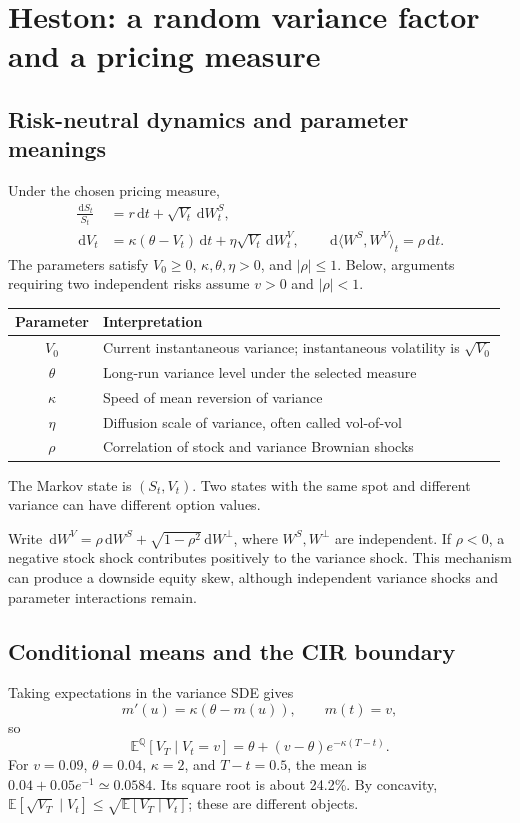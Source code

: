 \documentclass[10pt]{article}
\newcommand{\E}{\mathbb E}\newcommand{\Q}{\mathbb Q}\newcommand{\cF}{\mathcal F}
\newcommand{\dd}{\,\mathrm d}\newcommand{\Pp}{\mathbb P}\newcommand{\Var}{\operatorname{Var}}\newcommand{\Cov}{\operatorname{Cov}}
\theoremstyle{definition}\newtheorem{definition}{Definition}[section]
\begin{document}
\section{Heston: a random variance factor and a pricing measure}
\subsection{Risk-neutral dynamics and parameter meanings}
Under the chosen pricing measure,
\[
\boxed{\begin{aligned}
\frac{\dd S_t}{S_t}&=r\dd t+\sqrt{V_t}\dd W_t^S,\\
\dd V_t&=\kappa(\theta-V_t)\dd t+\eta\sqrt{V_t}\dd W_t^V,
\qquad \dd\langle W^S,W^V\rangle_t=\rho\dd t.
\end{aligned}}
\]
The parameters satisfy \(V_0\geq0\), \(\kappa,\theta,\eta>0\), and
\(|\rho|\leq1\). Below, arguments requiring two independent risks assume
\(v>0\) and \(|\rho|<1\).
\begin{center}
\begin{tabular}{cL{.72\textwidth}}
\toprule Parameter & Interpretation\\\midrule
\(V_0\) & Current instantaneous variance; instantaneous volatility is \(\sqrt{V_0}\)\\
\(\theta\) & Long-run variance level under the selected measure\\
\(\kappa\) & Speed of mean reversion of variance\\
\(\eta\) & Diffusion scale of variance, often called vol-of-vol\\
\(\rho\) & Correlation of stock and variance Brownian shocks\\\bottomrule
\end{tabular}
\end{center}
The Markov state is \((S_t,V_t)\). Two states with the same spot and
different variance can have different option values.

Write \(\dd W^V=\rho\dd W^S+\sqrt{1-\rho^2}\dd W^\perp\), where
\(W^S,W^\perp\) are independent. If \(\rho<0\), a negative stock shock
contributes positively to the variance shock. This mechanism can produce
a downside equity skew, although independent variance shocks and parameter
interactions remain.

\subsection{Conditional means and the CIR boundary}
Taking expectations in the variance SDE gives
\[
m'(u)=\kappa(\theta-m(u)),\qquad m(t)=v,
\]
so
\[
\boxed{\E^\Q[V_T\mid V_t=v]=\theta+(v-\theta)e^{-\kappa(T-t)}.}
\]
For \(v=0.09\), \(\theta=0.04\), \(\kappa=2\), and \(T-t=0.5\), the mean is
\(0.04+0.05e^{-1}\simeq0.0584\). Its square root is about 24.2\%.
By concavity, \(\E[\sqrt{V_T}\mid V_t]\leq\sqrt{\E[V_T\mid V_t]}\);
these are different objects.
\end{document}
